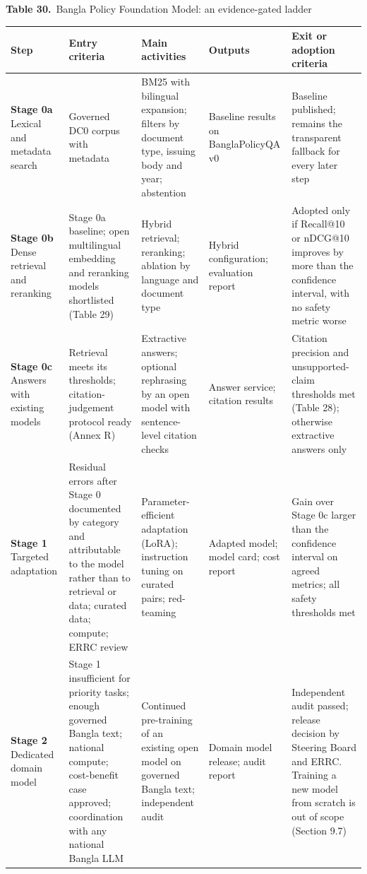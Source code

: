 \documentclass[border=10pt]{standalone}
\begin{document}
\begin{minipage}{17cm}
{\large\bfseries Table 30.}\ {\large Bangla Policy Foundation Model: an evidence-gated ladder}\par\vspace{7pt}
\small
{}
\begin{tabularx}{\linewidth}{@{}>{\hsize=0.619\hsize\raggedright\arraybackslash}X>{\hsize=1.143\hsize\raggedright\arraybackslash}X>{\hsize=1.190\hsize\raggedright\arraybackslash}X>{\hsize=0.810\hsize\raggedright\arraybackslash}X>{\hsize=1.238\hsize\raggedright\arraybackslash}X@{}}
\arrayrulecolor{bapilrule}\toprule
\rowcolor{white}\textbf{Step} & \textbf{Entry criteria} & \textbf{Main activities} & \textbf{Outputs} & \textbf{Exit or adoption criteria} \\
\midrule
\textbf{Stage 0a} Lexical and metadata search & Governed DC0 corpus with metadata & BM25 with bilingual expansion; filters by document type, issuing body and year; abstention & Baseline results on BanglaPolicyQA v0 & Baseline published; remains the transparent fallback for every later step \\
\textbf{Stage 0b} Dense retrieval and reranking & Stage 0a baseline; open multilingual embedding and reranking models shortlisted (Table 29) & Hybrid retrieval; reranking; ablation by language and document type & Hybrid configuration; evaluation report & Adopted only if Recall@10 or nDCG@10 improves by more than the confidence interval, with no safety metric worse \\
\textbf{Stage 0c} Answers with existing models & Retrieval meets its thresholds; citation-judgement protocol ready (Annex R) & Extractive answers; optional rephrasing by an open model with sentence-level citation checks & Answer service; citation results & Citation precision and unsupported-claim thresholds met (Table 28); otherwise extractive answers only \\
\textbf{Stage 1} Targeted adaptation & Residual errors after Stage 0 documented by category and attributable to the model rather than to retrieval or data; curated data; compute; ERRC review & Parameter-efficient adaptation (LoRA); instruction tuning on curated pairs; red-teaming & Adapted model; model card; cost report & Gain over Stage 0c larger than the confidence interval on agreed metrics; all safety thresholds met \\
\textbf{Stage 2} Dedicated domain model & Stage 1 insufficient for priority tasks; enough governed Bangla text; national compute; cost-benefit case approved; coordination with any national Bangla LLM & Continued pre-training of an existing open model on governed Bangla text; independent audit & Domain model release; audit report & Independent audit passed; release decision by Steering Board and ERRC. Training a new model from scratch is out of scope (Section 9.7) \\
\bottomrule
\end{tabularx}
\par{}
\end{minipage}
\end{document}
